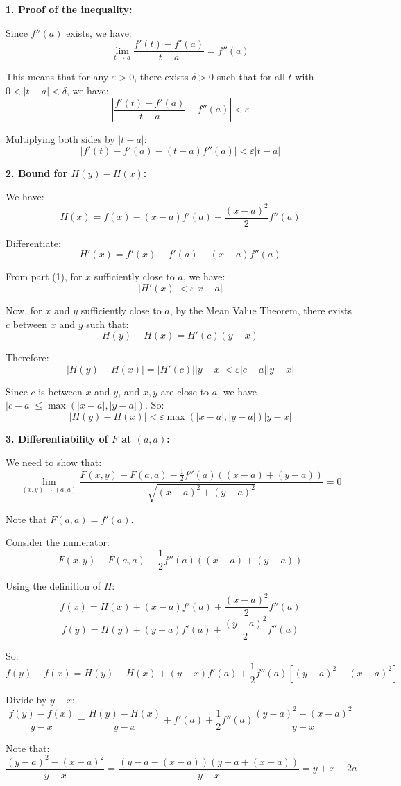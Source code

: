 \documentclass[12pt]{article}
\begin{document}
\begin{correctionbox}
\textbf{1. Proof of the inequality:}

Since $f''(a)$ exists, we have:
$$\lim_{t\to a} \frac{f'(t) - f'(a)}{t - a} = f''(a)$$

This means that for any $\varepsilon > 0$, there exists $\delta > 0$ such that for all $t$ with $0 < |t - a| < \delta$, we have:
$$\left|\frac{f'(t) - f'(a)}{t - a} - f''(a)\right| < \varepsilon$$

Multiplying both sides by $|t - a|$:
$$|f'(t) - f'(a) - (t - a)f''(a)| < \varepsilon|t - a|$$

\textbf{2. Bound for $H(y) - H(x)$:}

We have:
$$H(x) = f(x) - (x - a)f'(a) - \frac{(x - a)^2}{2}f''(a)$$

Differentiate:
$$H'(x) = f'(x) - f'(a) - (x - a)f''(a)$$

From part (1), for $x$ sufficiently close to $a$, we have:
$$|H'(x)| < \varepsilon|x - a|$$

Now, for $x$ and $y$ sufficiently close to $a$, by the Mean Value Theorem, there exists $c$ between $x$ and $y$ such that:
$$H(y) - H(x) = H'(c)(y - x)$$

Therefore:
$$|H(y) - H(x)| = |H'(c)||y - x| < \varepsilon|c - a||y - x|$$

Since $c$ is between $x$ and $y$, and $x,y$ are close to $a$, we have $|c - a| \leq \max(|x - a|, |y - a|)$. So:
$$|H(y) - H(x)| < \varepsilon \max(|x - a|, |y - a|) |y - x|$$

\textbf{3. Differentiability of $F$ at $(a,a)$:}

We need to show that:
$$\lim_{(x,y)\to(a,a)} \frac{F(x,y) - F(a,a) - \frac{1}{2}f''(a)((x-a) + (y-a))}{\sqrt{(x-a)^2 + (y-a)^2}} = 0$$

Note that $F(a,a) = f'(a)$.

Consider the numerator:
$$F(x,y) - F(a,a) - \frac{1}{2}f''(a)((x-a) + (y-a))$$

Using the definition of $H$:
$$f(x) = H(x) + (x - a)f'(a) + \frac{(x - a)^2}{2}f''(a)$$
$$f(y) = H(y) + (y - a)f'(a) + \frac{(y - a)^2}{2}f''(a)$$

So:
$$f(y) - f(x) = H(y) - H(x) + (y - x)f'(a) + \frac{1}{2}f''(a)[(y - a)^2 - (x - a)^2]$$

Divide by $y - x$:
$$\frac{f(y) - f(x)}{y - x} = \frac{H(y) - H(x)}{y - x} + f'(a) + \frac{1}{2}f''(a)\frac{(y - a)^2 - (x - a)^2}{y - x}$$

Note that:
$$\frac{(y - a)^2 - (x - a)^2}{y - x} = \frac{(y - a - (x - a))(y - a + (x - a))}{y - x} = y + x - 2a$$


\end{correctionbox}
\end{document}
